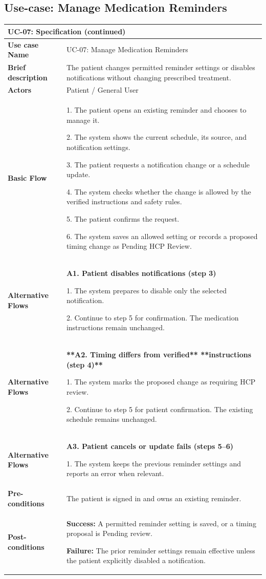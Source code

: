 \subsection{Use-case: Manage Medication Reminders}
\label{uc:uc-07}
\begin{longtable}{|p{}|p{}|}
\hline
\endfirsthead
\multicolumn{2}{l}{\textbf{UC-07: Specification (continued)}} \\
\hline
\endhead
\textbf{Use case Name} & UC-07: Manage Medication Reminders \\ \hline
\textbf{Brief description} & The patient changes permitted reminder settings or disables notifications without changing prescribed treatment. \\ \hline
\textbf{Actors} & Patient / General User \\ \hline
\textbf{Basic Flow} &
1. The patient opens an existing reminder and chooses to manage it.\par
2. The system shows the current schedule, its source, and notification settings.\par
3. The patient requests a notification change or a schedule update.\par
4. The system checks whether the change is allowed by the verified instructions and safety rules.\par
5. The patient confirms the request.\par
6. The system saves an allowed setting or records a proposed timing change as Pending HCP Review.
\\ \hline
\textbf{Alternative Flows} &
\textbf{A1. Patient disables notifications (step 3)}\par
1. The system prepares to disable
only the selected notification.\par
2. Continue to step 5 for confirmation.
The medication instructions remain unchanged.
\\ \hline
\textbf{Alternative Flows} &
\textbf{**A2. Timing differs from verified**
**instructions (step 4)**}\par
1. The system marks the proposed
change as requiring HCP review.\par
2. Continue to step 5 for patient
confirmation. The existing schedule
remains unchanged.
\\ \hline
\textbf{Alternative Flows} &
\textbf{A3. Patient cancels or update fails (steps 5--6)}\par
1. The system keeps the previous reminder settings and reports an error when relevant.
\\ \hline
\textbf{Pre-conditions} & The patient is signed in and owns an existing reminder. \\ \hline
\textbf{Post-conditions} & \textbf{Success:} A permitted reminder setting is saved, or a timing proposal is Pending review.\par
\textbf{Failure:} The prior reminder settings remain effective unless the patient explicitly disabled a notification. \\ \hline
\end{longtable}
\clearpage
